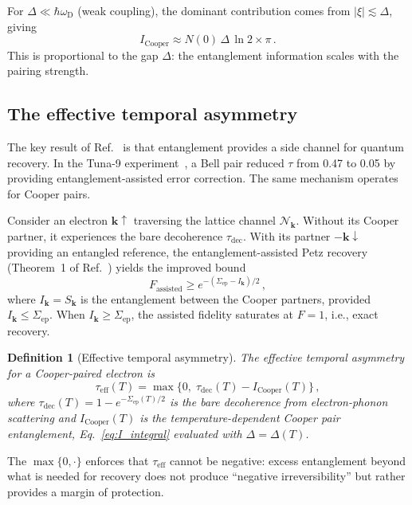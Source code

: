 \documentclass[prb,twocolumn,superscriptaddress,longbibliography,floatfix]{revtex4-2}
\newtheorem{definition}[theorem]{Definition}
\newcommand{\chan}{\mathcal{N}}
\newcommand{\tauasym}{\tau}
\newcommand{\taueff}{\tauasym_{\mathrm{eff}}}
\newcommand{\taudec}{\tauasym_{\mathrm{dec}}}
\newcommand{\Icoop}{I_{\mathrm{Cooper}}}
\newcommand{\oD}{\omega_{\mathrm{D}}}
\begin{document}
For $\Delta \ll \hbar\oD$ (weak coupling), the dominant
contribution comes from $|\xi| \lesssim \Delta$, giving
\begin{equation}\label{eq:I_approx}
  \Icoop \approx N(0)\, \Delta\, \ln 2 \times \pi\,.
\end{equation}
This is proportional to the gap $\Delta$: the entanglement
information scales with the pairing strength.

\subsection{The effective temporal asymmetry}

The key result of Ref.~\cite{Huang2026} is that entanglement
provides a side channel for quantum recovery.  In the Tuna-9
experiment~\cite{Huang2026exp}, a Bell pair reduced $\tauasym$
from 0.47 to 0.05 by providing entanglement-assisted error
correction.  The same mechanism operates for Cooper pairs.

Consider an electron $\bm{k}\!\uparrow$ traversing the
lattice channel $\chan_{\bm{k}}$.  Without its Cooper partner,
it experiences the bare decoherence $\taudec$.  With its
partner $-\bm{k}\!\downarrow$ providing an entangled reference,
the entanglement-assisted Petz recovery
(Theorem~1 of Ref.~\cite{Devetak2005}) yields the improved
bound
\begin{equation}\label{eq:assisted_bound}
  F_{\mathrm{assisted}} \geq
  e^{-(\Sigma_{\mathrm{ep}} - I_{\bm{k}})/2}\,,
\end{equation}
where $I_{\bm{k}} = S_{\bm{k}}$ is the entanglement between
the Cooper partners, provided $I_{\bm{k}} \leq \Sigma_{\mathrm{ep}}$.
When $I_{\bm{k}} \geq \Sigma_{\mathrm{ep}}$, the assisted
fidelity saturates at $F = 1$, i.e., exact recovery.

\begin{definition}[Effective temporal asymmetry]
\label{def:tau_eff}
The effective temporal asymmetry for a Cooper-paired electron
is
\begin{equation}\label{eq:tau_eff}
  \taueff(T) = \max\!\bigl\{0,\;\taudec(T) - \Icoop(T)\bigr\}\,,
\end{equation}
where $\taudec(T) = 1 - e^{-\Sigma_{\mathrm{ep}}(T)/2}$ is
the bare decoherence from electron-phonon scattering and
$\Icoop(T)$ is the temperature-dependent Cooper pair
entanglement, Eq.~\eqref{eq:I_integral} evaluated with
$\Delta = \Delta(T)$.
\end{definition}

The $\max\{0, \cdot\}$ enforces that $\taueff$ cannot be
negative: excess entanglement beyond what is needed for
recovery does not produce ``negative irreversibility'' but
rather provides a margin of protection.
\end{document}
